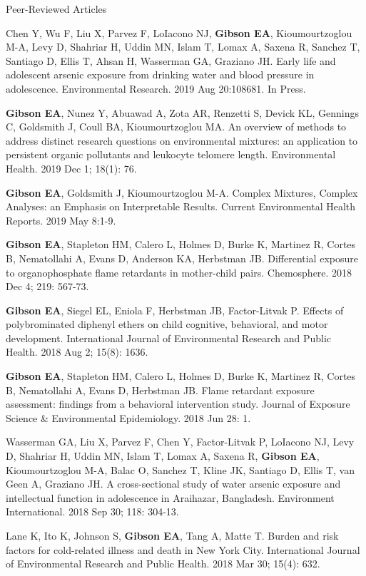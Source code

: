 \documentclass[a4paper,10pt]{article}
\newlength{\cvcolumngapwidth}
\newlength{\cvleftcolumnwidth}
\newlength{\cvrightcolumnwidth}
\newcommand{\cvdurationstyle}[1]{{\small\cvdurationfont\textcolor{cvdurationcolor}{#1}}}
\newlength{\cvafteritemskipamount}
\newlength{\cvparskip}
\newcommand{\cvitem}[2]{
    \begin{minipage}[t]{\cvleftcolumnwidth}
        \raggedleft #1
    \end{minipage}%
    \hspace{\cvcolumngapwidth}%
    \begin{minipage}[t]{\cvrightcolumnwidth}
        \setlength{\parskip}{\cvparskip} #2
    \end{minipage}

    \vspace{\cvafteritemskipamount}
}
\begin{document}
\cvitem{
    \cvdurationstyle{Peer-Reviewed Articles}
}{  
    \begin{etaremune}
	\item Chen Y, Wu F, Liu X, Parvez F, LoIacono NJ, \textbf{Gibson EA}, Kioumourtzoglou M-A, Levy D, Shahriar H, Uddin MN, Islam T, Lomax A, Saxena R, Sanchez T, Santiago D, Ellis T, Ahsan H, Wasserman GA, Graziano JH. Early life and adolescent arsenic exposure from drinking water and blood pressure in adolescence. Environmental Research. 2019 Aug 20:108681. In Press.
	\item \textbf{Gibson EA}, Nunez Y, Abuawad A, Zota AR, Renzetti S, Devick KL, Gennings C, Goldsmith J, Coull BA, Kioumourtzoglou MA. An overview of methods to address distinct research questions on environmental mixtures: an application to persistent organic pollutants and leukocyte telomere length. Environmental Health. 2019 Dec 1; 18(1): 76. 
	\item \textbf{Gibson EA}, Goldsmith J, Kioumourtzoglou M-A. Complex Mixtures, Complex Analyses: an Emphasis on Interpretable Results. Current Environmental Health Reports. 2019 May 8:1-9. \\
	\item \textbf{Gibson EA}, Stapleton HM, Calero L, Holmes D, Burke K, Martinez R, Cortes B, Nematollahi A, Evans D, Anderson KA, Herbstman JB. Differential exposure to organophosphate flame retardants in mother-child pairs. Chemosphere. 2018 Dec 4; 219: 567-73. 
	\item \textbf{Gibson EA}, Siegel EL, Eniola F, Herbstman JB, Factor-Litvak P. Effects of polybrominated diphenyl ethers on child cognitive, behavioral, and motor development. International Journal of Environmental Research and Public Health. 2018 Aug 2; 15(8): 1636. 
	\item \textbf{Gibson EA}, Stapleton HM, Calero L, Holmes D, Burke K, Martinez R, Cortes B, Nematollahi A, Evans D, Herbstman JB. Flame retardant exposure assessment: findings from a behavioral intervention study. Journal of Exposure Science \& Environmental Epidemiology. 2018 Jun 28: 1. 
	\item Wasserman GA, Liu X, Parvez F, Chen Y, Factor-Litvak P, LoIacono NJ, Levy D, Shahriar H, Uddin MN, Islam T, Lomax A, Saxena R, \textbf{Gibson EA}, Kioumourtzoglou M-A, Balac O, Sanchez T, Kline JK, Santiago D, Ellis T, van Geen A, Graziano JH. A cross-sectional study of water arsenic exposure and intellectual function in adolescence in Araihazar, Bangladesh. Environment International. 2018 Sep 30; 118: 304-13.
	\item Lane K, Ito K, Johnson S, \textbf{Gibson EA}, Tang A, Matte T. Burden and risk factors for cold-related illness and death in New York City. International Journal of Environmental Research and Public Health. 2018 Mar 30; 15(4): 632. 
    \end{etaremune}
}
\end{document}
